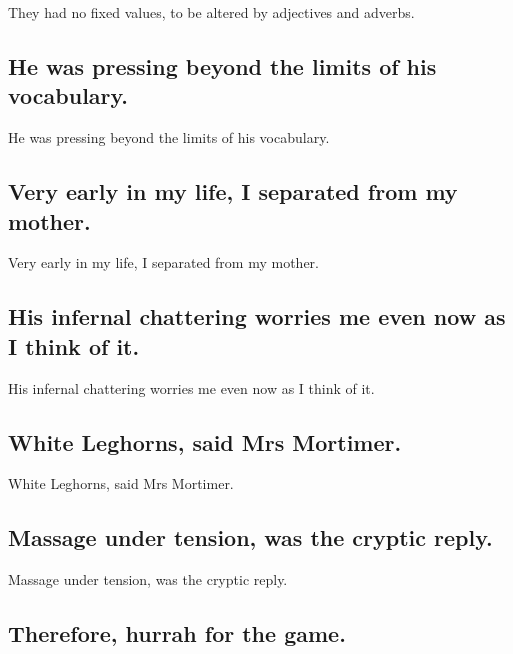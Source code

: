 \documentclass[]{article}
\begin{document}
They had no fixed values, to be altered by adjectives and adverbs.

\hypertarget{he-was-pressing-beyond-the-limits-of-his-vocabulary.}{%
\subsection{He was pressing beyond the limits of his
vocabulary.}\label{he-was-pressing-beyond-the-limits-of-his-vocabulary.}}

He was pressing beyond the limits of his vocabulary.

\hypertarget{very-early-in-my-life-i-separated-from-my-mother.}{%
\subsection{Very early in my life, I separated from my
mother.}\label{very-early-in-my-life-i-separated-from-my-mother.}}

Very early in my life, I separated from my mother.

\hypertarget{his-infernal-chattering-worries-me-even-now-as-i-think-of-it.}{%
\subsection{His infernal chattering worries me even now as I think of
it.}\label{his-infernal-chattering-worries-me-even-now-as-i-think-of-it.}}

His infernal chattering worries me even now as I think of it.

\hypertarget{white-leghorns-said-mrs-mortimer.}{%
\subsection{White Leghorns, said Mrs
Mortimer.}\label{white-leghorns-said-mrs-mortimer.}}

White Leghorns, said Mrs Mortimer.

\hypertarget{massage-under-tension-was-the-cryptic-reply.}{%
\subsection{Massage under tension, was the cryptic
reply.}\label{massage-under-tension-was-the-cryptic-reply.}}

Massage under tension, was the cryptic reply.

\hypertarget{therefore-hurrah-for-the-game.}{%
\subsection{Therefore, hurrah for the
game.}\label{therefore-hurrah-for-the-game.}}
\end{document}
